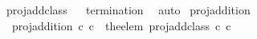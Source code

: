 \begin{isabellebody}
\ proj{\isacharunderscore}add{\isacharunderscore}class%
\isadelimproof
\ %
\endisadelimproof
%
\isatagproof
{}\isamarkupfalse%
\ {\isachardoublequoteopen}termination{\isachardoublequoteclose}\ \isamarkupfalse%
\ auto%
\endisatagproof
{\isafoldproof}%
%
\isadelimproof
%
\endisadelimproof
\isanewline
\isanewline
{}\isamarkupfalse%
\ proj{\isacharunderscore}addition\ \ \isanewline
\ \ {\isachardoublequoteopen}proj{\isacharunderscore}addition\ c{}\ c{}\ {\isacharequal}\ the{\isacharunderscore}elem\ {\isacharparenleft}proj{\isacharunderscore}add{\isacharunderscore}class\ c{}\ c{}{\isacharparenright}{\isachardoublequoteclose}\isanewline
\isanewline
\isanewline
\isanewline
{}\isamarkupfalse%
\isanewline
%
\isadelimtheory
\isanewline
%
\endisadelimtheory
%
\isatagtheory
{}\isamarkupfalse%
%
\endisatagtheory
{\isafoldtheory}%
%
\isadelimtheory
%
\endisadelimtheory
%
\end{isabellebody}%
\endinput
